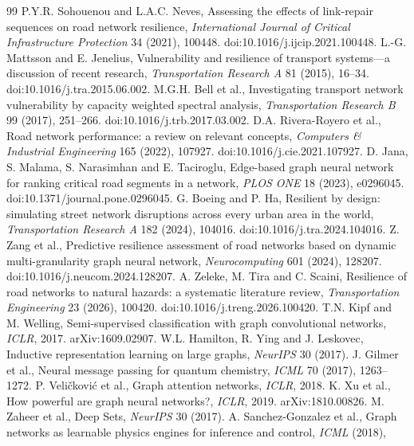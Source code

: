 \documentclass[11pt]{article}
\begin{document}
\begin{thebibliography}{99}
 P.Y.R. Sohouenou and L.A.C. Neves, Assessing the
effects of link-repair sequences on road network resilience,
\emph{International Journal of Critical Infrastructure Protection} 34 (2021),
100448. doi:10.1016/j.ijcip.2021.100448.
 L.-G. Mattsson and E. Jenelius, Vulnerability and
resilience of transport systems---a discussion of recent research,
\emph{Transportation Research A} 81 (2015), 16--34.
doi:10.1016/j.tra.2015.06.002.
 M.G.H. Bell et al., Investigating transport network
vulnerability by capacity weighted spectral analysis, \emph{Transportation
Research B} 99 (2017), 251--266. doi:10.1016/j.trb.2017.03.002.
 D.A. Rivera-Royero et al., Road network performance: a
review on relevant concepts, \emph{Computers \& Industrial Engineering} 165
(2022), 107927. doi:10.1016/j.cie.2021.107927.
 D. Jana, S. Malama, S. Narasimhan and E. Taciroglu,
Edge-based graph neural network for ranking critical road segments in a
network, \emph{PLOS ONE} 18 (2023), e0296045.
doi:10.1371/journal.pone.0296045.
 G. Boeing and P. Ha, Resilient by design: simulating
street network disruptions across every urban area in the world,
\emph{Transportation Research A} 182 (2024), 104016.
doi:10.1016/j.tra.2024.104016.
 Z. Zang et al., Predictive resilience assessment of road
networks based on dynamic multi-granularity graph neural network,
\emph{Neurocomputing} 601 (2024), 128207.
doi:10.1016/j.neucom.2024.128207.
 A. Zeleke, M. Tira and C. Scaini, Resilience of road
networks to natural hazards: a systematic literature review,
\emph{Transportation Engineering} 23 (2026), 100420.
doi:10.1016/j.treng.2026.100420.
 T.N. Kipf and M. Welling, Semi-supervised classification
with graph convolutional networks, \emph{ICLR}, 2017. arXiv:1609.02907.
 W.L. Hamilton, R. Ying and J. Leskovec, Inductive
representation learning on large graphs, \emph{NeurIPS} 30 (2017).
 J. Gilmer et al., Neural message passing for quantum
chemistry, \emph{ICML} 70 (2017), 1263--1272.
 P. Veli\v{c}kovi\'c et al., Graph attention networks,
\emph{ICLR}, 2018.
 K. Xu et al., How powerful are graph neural networks?,
\emph{ICLR}, 2019. arXiv:1810.00826.
 M. Zaheer et al., Deep Sets, \emph{NeurIPS} 30 (2017).
 A. Sanchez-Gonzalez et al., Graph networks as
learnable physics engines for inference and control, \emph{ICML} (2018),

\end{thebibliography}
\end{document}
